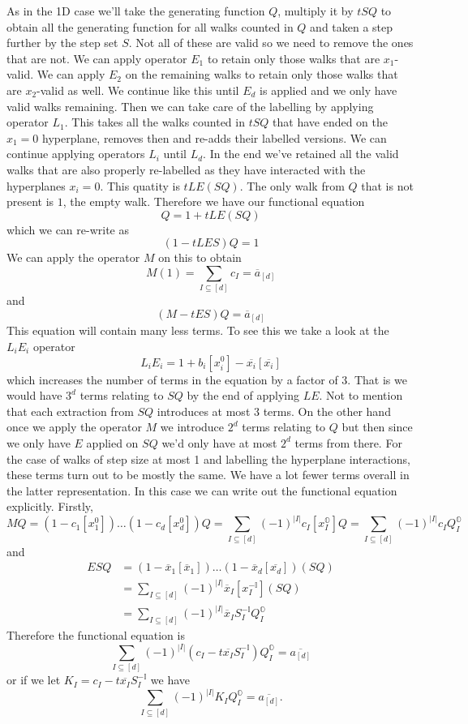 \documentclass[12pt]{article}
\newcommand{\oo}{\mathbb{O}}
\newcommand{\one}{\mathbb{I}}
\theoremstyle{definition} \newtheorem{definition}[theorem]{Definition}
\newcommand{\ol}[1]{\overline{#1}}
\begin{document}
As in the 1D case we'll take the generating function $Q$, multiply it by $tSQ$ to obtain all the generating function for all walks counted in $Q$ and taken a step further by the step set $S$. Not all of these are valid so we need to remove the ones that are not. We can apply operator $E_1$ to retain only those walks that are $x_1$-valid. We can apply $E_2$ on the remaining walks to retain only those walks that are $x_2$-valid as well. We continue like this until $E_d$ is applied and we only have valid walks remaining. Then we can take care of the labelling by applying operator $L_1$. This takes all the walks counted in $tSQ$ that have ended on the $x_1 = 0$ hyperplane, removes then and re-adds their labelled versions. We can continue applying operators $L_i$ until $L_d$. In the end we've retained all the valid walks that are also properly re-labelled as they have interacted with the hyperplanes $x_i = 0$. This quatity is $tLE(SQ)$. The only walk from $Q$ that is not present is $1$, the empty walk. Therefore we have our functional equation
\[
	Q = 1 + tLE(SQ)
\]
which we can re-write as
\[
	(1-tLES)Q = 1
\]
We can apply the operator $M$ on this to obtain
\[
	M(1) = \sum_{I\subseteq [d]}c_I = \ol{a}_{[d]}
\]
and
\[
   (M-tES)Q = \ol{a}_{[d]}
\]
This equation will contain many less terms. To see this we take a look at the $L_iE_i$ operator
\[
	L_iE_i = 1 + b_i[x_i^0]-\ol{x_i}[\ol{x_i}]
\]
which increases the number of terms in the equation by a factor of 3. That is we would have $3^d$ terms relating to $SQ$ by the end of applying $LE$. Not to mention that each extraction from $SQ$ introduces at most 3 terms. On the other hand once we apply the operator $M$ we introduce $2^d$ terms relating to $Q$ but then since we only have $E$ applied on $SQ$ we'd only have at most $2^d$ terms from there. For the case of walks of step size at most 1 and labelling the hyperplane interactions, these terms turn out to be mostly the same. We have a lot fewer terms overall in the latter representation. In this case we can write out the functional equation explicitly. Firstly,
\[
	M Q = (1-c_1[x_1^0])\ldots(1-c_d[x_d^0])Q = \sum_{I\subseteq [d]} (-1)^{|I|} c_I[x_I^\oo]Q =  \sum_{I\subseteq [d]} (-1)^{|I|} c_I Q_I^\oo
\]
and
\begin{align*}
	 ESQ &= (1-\ol{x}_1[\ol{x}_1])\ldots(1-\ol{x}_d[\ol{x_d}])(SQ) \\
	 &= \sum_{I\subseteq [d]} (-1)^{|I|} \ol{x}_I [x_I^{-\one}](SQ) \\
	 &= \sum_{I\subseteq [d]} (-1)^{|I|} \ol{x}_I S_I^{-\one}Q_I^\oo
\end{align*}
Therefore the functional equation is
\[
    \sum_{I \subseteq [d]}(-1)^{|I|}(c_I-t \ol{x_I}S_{I}^{-\one})Q_I^\oo = \ol{a_{[d]}}
\]
or if we let $K_I = c_I-t \ol{x_I}S_{I}^{-\one}$ we have
\[
   \sum_{I\subseteq [d]}(-1)^{|I|} K_I Q_I^\oo = \ol{a_{[d]}}.
\]
\end{document}
